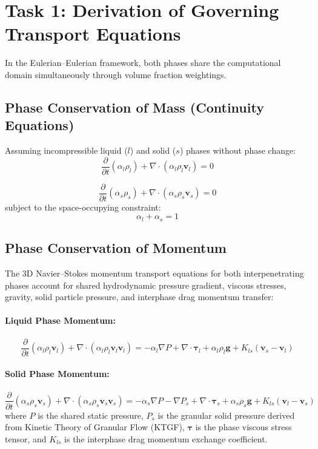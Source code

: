 \documentclass[12pt,a4paper]{article}
\begin{document}
\section{Task 1: Derivation of Governing Transport Equations}
In the Eulerian--Eulerian framework, both phases share the computational domain simultaneously through volume fraction weightings.

\subsection{Phase Conservation of Mass (Continuity Equations)}
Assuming incompressible liquid ($l$) and solid ($s$) phases without phase change:
\begin{equation}
\frac{\partial}{\partial t} (\alpha_l \rho_l) + \nabla \cdot (\alpha_l \rho_l \mathbf{v}_l) = 0
\end{equation}

\begin{equation}
\frac{\partial}{\partial t} (\alpha_s \rho_s) + \nabla \cdot (\alpha_s \rho_s \mathbf{v}_s) = 0
\end{equation}
subject to the space-occupying constraint:
\begin{equation}
\alpha_l + \alpha_s = 1
\end{equation}

\subsection{Phase Conservation of Momentum}
The 3D Navier--Stokes momentum transport equations for both interpenetrating phases account for shared hydrodynamic pressure gradient, viscous stresses, gravity, solid particle pressure, and interphase drag momentum transfer:

\paragraph{Liquid Phase Momentum:}
\begin{equation}
\frac{\partial}{\partial t}(\alpha_l \rho_l \mathbf{v}_l) + \nabla \cdot (\alpha_l \rho_l \mathbf{v}_l \mathbf{v}_l) = -\alpha_l \nabla P + \nabla \cdot \boldsymbol{\tau}_l + \alpha_l \rho_l \mathbf{g} + K_{ls}(\mathbf{v}_s - \mathbf{v}_l)
\end{equation}

\paragraph{Solid Phase Momentum:}
\begin{equation}
\frac{\partial}{\partial t}(\alpha_s \rho_s \mathbf{v}_s) + \nabla \cdot (\alpha_s \rho_s \mathbf{v}_s \mathbf{v}_s) = -\alpha_s \nabla P - \nabla P_s + \nabla \cdot \boldsymbol{\tau}_s + \alpha_s \rho_s \mathbf{g} + K_{ls}(\mathbf{v}_l - \mathbf{v}_s)
\end{equation}
where $P$ is the shared static pressure, $P_s$ is the granular solid pressure derived from Kinetic Theory of Granular Flow (KTGF), $\boldsymbol{\tau}$ is the phase viscous stress tensor, and $K_{ls}$ is the interphase drag momentum exchange coefficient.
\end{document}
